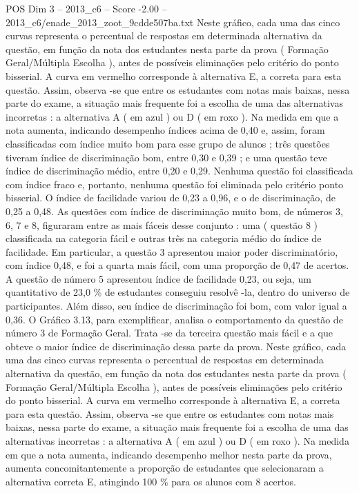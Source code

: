 \begin{textsample}{POS Dim 3 – 2013\_c6 – Score -2.00 – 2013\_c6/enade\_2013\_zoot\_9cdde507ba.txt}
Neste gráfico, cada uma das cinco curvas representa o percentual de respostas em determinada alternativa da questão, em função da nota dos estudantes nesta parte da prova ( Formação Geral/Múltipla Escolha ), antes de possíveis eliminações pelo critério do ponto bisserial.
A curva em vermelho corresponde à alternativa E, a correta para esta questão.
Assim, observa -se que entre os estudantes com notas mais baixas, nessa parte do exame, a situação mais frequente foi a escolha de uma das alternativas incorretas : a alternativa A ( em azul ) ou D ( em roxo ).
Na medida em que a nota aumenta, indicando desempenho índices acima de 0,40 e, assim, foram classificadas com índice muito bom para esse grupo de alunos ; três questões tiveram índice de discriminação bom, entre 0,30 e 0,39 ; e uma questão teve índice de discriminação médio, entre 0,20 e 0,29.
Nenhuma questão foi classificada com índice fraco e, portanto, nenhuma questão foi eliminada pelo critério ponto bisserial.
O índice de facilidade variou de 0,23 a 0,96, e o de discriminação, de 0,25 a 0,48.
As questões com índice de discriminação muito bom, de números 3, 6, 7 e 8, figuraram entre as mais fáceis desse conjunto : uma ( questão 8 ) classificada na categoria fácil e outras três na categoria médio do índice de facilidade.
Em particular, a questão 3 apresentou maior poder discriminatório, com índice 0,48, e foi a quarta mais fácil, com uma proporção de 0,47 de acertos.
A questão de número 5 apresentou índice de facilidade 0,23, ou seja, um quantitativo de 23,0 \% de estudantes conseguiu resolvê -la, dentro do universo de participantes.
Além disso, seu índice de discriminação foi bom, com valor igual a 0,36.
O Gráfico 3.13, para exemplificar, analisa o comportamento da questão de número 3 de Formação Geral.
Trata -se da terceira questão mais fácil e a que obteve o maior índice de discriminação dessa parte da prova.
Neste gráfico, cada uma das cinco curvas representa o percentual de respostas em determinada alternativa da questão, em função da nota dos estudantes nesta parte da prova ( Formação Geral/Múltipla Escolha ), antes de possíveis eliminações pelo critério do ponto bisserial.
A curva em vermelho corresponde à alternativa E, a correta para esta questão.
Assim, observa -se que entre os estudantes com notas mais baixas, nessa parte do exame, a situação mais frequente foi a escolha de uma das alternativas incorretas : a alternativa A ( em azul ) ou D ( em roxo ).
Na medida em que a nota aumenta, indicando desempenho melhor nesta parte da prova, aumenta concomitantemente a proporção de estudantes que selecionaram a alternativa correta E, atingindo 100 \% para os alunos com 8 acertos.

\end{textsample}
